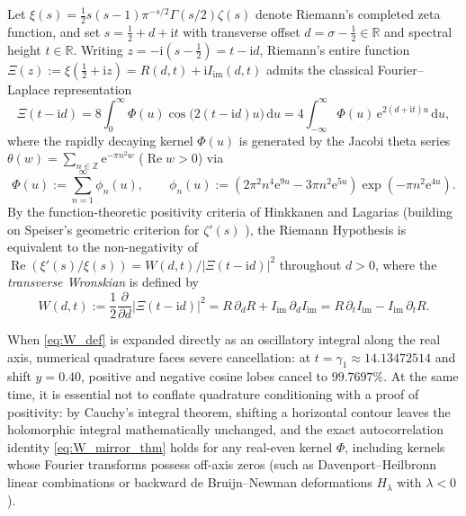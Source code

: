 \documentclass[11pt,a4paper,reqno]{amsart}
\theoremstyle{definition}
\theoremstyle{remark}
\numberwithin{equation}{section}
\newcommand{\dd}{\mathrm{d}}
\newcommand{\ii}{\mathrm{i}}
\newcommand{\ee}{\mathrm{e}}
\newcommand{\Rea}{\operatorname{Re}}
\begin{document}
Let $\xi(s) = \frac{1}{2}s(s-1)\pi^{-s/2}\Gamma(s/2)\zeta(s)$ denote Riemann's completed zeta function, and set $s = \frac{1}{2} + d + \ii t$ with transverse offset $d = \sigma - \frac{1}{2} \in \mathbb{R}$ and spectral height $t \in \mathbb{R}$. Writing $z = -\ii(s - \frac{1}{2}) = t - \ii d$, Riemann's entire function $\Xi(z) := \xi(\frac{1}{2} + \ii z) = R(d,t) + \ii I_{\mathrm{im}}(d,t)$ admits the classical Fourier--Laplace representation \cite{Riemann1859,Polya1926,Titchmarsh1986}
\begin{equation}\label{eq:Xi_integral}
\Xi(t - \ii d) = 8\int_0^\infty \Phi(u)\cos\bigl(2(t - \ii d)u\bigr)\,\dd u = 4\int_{-\infty}^\infty \Phi(u)\,\ee^{2(d + \ii t)u}\,\dd u,
\end{equation}
where the rapidly decaying kernel $\Phi(u)$ is generated by the Jacobi theta series $\theta(w) = \sum_{n\in\mathbb{Z}} \ee^{-\pi n^2 w}$ ($\Rea w > 0$) via
\begin{equation}\label{eq:Phi_def}
\Phi(u) := \sum_{n=1}^\infty \phi_n(u), \qquad \phi_n(u) := \left(2\pi^2 n^4 \ee^{9u} - 3\pi n^2 \ee^{5u}\right)\exp\!\left(-\pi n^2 \ee^{4u}\right).
\end{equation}
By the function-theoretic positivity criteria of Hinkkanen \cite{Hinkkanen1997} and Lagarias \cite{Lagarias1999} (building on Speiser's geometric criterion for $\zeta'(s)$ \cite{Speiser1934}), the Riemann Hypothesis is equivalent to the non-negativity of $\Rea(\xi'(s)/\xi(s)) = W(d,t)/|\Xi(t-\ii d)|^2$ throughout $d > 0$, where the \emph{transverse Wronskian} is defined by
\begin{equation}\label{eq:W_def}
W(d,t) := \frac{1}{2}\frac{\partial}{\partial d}\big|\Xi(t-\ii d)\big|^2 = R\,\partial_d R + I_{\mathrm{im}}\,\partial_d I_{\mathrm{im}} = R\,\partial_t I_{\mathrm{im}} - I_{\mathrm{im}}\,\partial_t R.
\end{equation}

When \eqref{eq:W_def} is expanded directly as an oscillatory integral along the real axis, numerical quadrature faces severe cancellation: at $t = \gamma_1 \approx 14.13472514$ and shift $y = 0.40$, positive and negative cosine lobes cancel to $99.7697\%$. At the same time, it is essential not to conflate quadrature conditioning with a proof of positivity: by Cauchy's integral theorem, shifting a horizontal contour leaves the holomorphic integral mathematically unchanged, and the exact autocorrelation identity \eqref{eq:W_mirror_thm} holds for any real-even kernel $\Phi$, including kernels whose Fourier transforms possess off-axis zeros (such as Davenport--Heilbronn linear combinations \cite{DavenportHeilbronn1936,Titchmarsh1986} or backward de Bruijn--Newman deformations $H_\lambda$ with $\lambda < 0$ \cite{DeBruijn1950,Newman1976,CsordasNorfolkVarga1986}).
\end{document}
